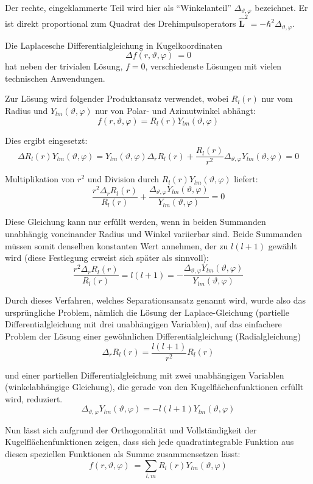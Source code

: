 \begin{definition}
\begin{description}
Der rechte, eingeklammerte Teil wird hier als \enquote{Winkelanteil} $\Delta_{\vartheta,\varphi}$ bezeichnet. Er ist direkt proportional zum Quadrat des Drehimpulsoperators $\hat{\mathbf{L}}^2=-\hbar^{2} \Delta_{\vartheta,\varphi}$.

Die Laplacesche Differentialgleichung in Kugelkoordinaten
\[
\Delta f(r,\vartheta,\varphi)\ = 0
\]
hat neben der trivialen Lösung, $f=0$, verschiedenste Lösungen mit vielen technischen Anwendungen.

Zur Lösung wird folgender Produktansatz verwendet, wobei $R_{l}(r)$ nur vom Radius und $Y_{lm}(\vartheta,\varphi)$ nur von Polar- und Azimutwinkel abhängt:
\[f(r,\vartheta,\varphi) = R_{l}(r) Y_{lm}(\vartheta,\varphi) \]

Dies ergibt eingesetzt:
\[\Delta R_{l}(r)Y_{lm}(\vartheta,\varphi)=Y_{lm}(\vartheta,\varphi)\Delta_{r}R_{l}(r)+\frac{R_{l}(r)}{r^{2}}\Delta_{\vartheta,\varphi}Y_{lm}(\vartheta,\varphi)=0\]

Multiplikation von $r^2$ und Division durch $R_{l}(r) Y_{lm}(\vartheta,\varphi)$ liefert:
\[\frac{r^{2}\Delta_{r}R_{l}(r)}{R_{l}(r)}+\frac{\Delta_{\vartheta,\varphi}Y_{lm}(\vartheta,\varphi)}{Y_{lm}(\vartheta,\varphi)}=0\]

Diese Gleichung kann nur erfüllt werden, wenn in beiden Summanden unabhängig voneinander Radius und Winkel variierbar sind. Beide Summanden müssen somit denselben konstanten Wert annehmen, der zu $l(l+1)$ gewählt wird (diese Festlegung erweist sich später als sinnvoll):
\[\frac{r^{2}\Delta_{r}R_{l}(r)}{R_{l}(r)}=l(l+1)=-\frac{\Delta_{\vartheta,\varphi}Y_{lm}(\vartheta,\varphi)}{Y_{lm}(\vartheta,\varphi)}\]

Durch dieses Verfahren, welches Separationsansatz genannt wird, wurde also das ursprüngliche Problem, nämlich die Lösung der Laplace-Gleichung (partielle Differentialgleichung mit drei unabhängigen Variablen), auf das einfachere Problem der Lösung einer gewöhnlichen Differentialgleichung (Radialgleichung)
\[\Delta_{r}R_{l}(r)=\frac{l(l+1)}{r^{2}}R_{l}(r)\]

und einer partiellen Differentialgleichung mit zwei unabhängigen Variablen (winkelabhängige Gleichung), die gerade von den Kugelflächenfunktionen erfüllt wird, reduziert.
\[\Delta_{\vartheta,\varphi}Y_{lm}(\vartheta,\varphi)=-l(l+1)Y_{lm}(\vartheta,\varphi)\]

Nun lässt sich aufgrund der Orthogonalität und Vollständigkeit der Kugelflächenfunktionen zeigen, dass sich jede quadratintegrable Funktion aus diesen speziellen Funktionen als Summe zusammensetzen lässt:
\[f(r,\vartheta,\varphi)\ = \sum_{l,m}R_{l}(r)Y_{lm}(\vartheta,\varphi)\]


\end{description}
\end{definition}

